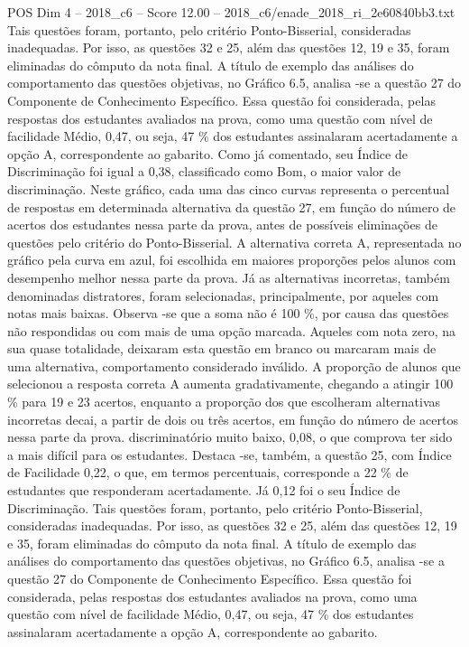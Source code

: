 \begin{textsample}{POS Dim 4 – 2018\_c6 – Score 12.00 – 2018\_c6/enade\_2018\_ri\_2e60840bb3.txt}
Tais questões foram, portanto, pelo critério Ponto-Bisserial, consideradas inadequadas.
Por isso, as questões 32 e 25, além das questões 12, 19 e 35, foram eliminadas do cômputo da nota final.
A título de exemplo das análises do comportamento das questões objetivas, no Gráfico 6.5, analisa -se a questão 27 do Componente de Conhecimento Específico.
Essa questão foi considerada, pelas respostas dos estudantes avaliados na prova, como uma questão com nível de facilidade Médio, 0,47, ou seja, 47 \% dos estudantes assinalaram acertadamente a opção A, correspondente ao gabarito.
Como já comentado, seu Índice de Discriminação foi igual a 0,38, classificado como Bom, o maior valor de discriminação.
Neste gráfico, cada uma das cinco curvas representa o percentual de respostas em determinada alternativa da questão 27, em função do número de acertos dos estudantes nessa parte da prova, antes de possíveis eliminações de questões pelo critério do Ponto-Bisserial.
A alternativa correta A, representada no gráfico pela curva em azul, foi escolhida em maiores proporções pelos alunos com desempenho melhor nessa parte da prova.
Já as alternativas incorretas, também denominadas distratores, foram selecionadas, principalmente, por aqueles com notas mais baixas.
Observa -se que a soma não é 100 \%, por causa das questões não respondidas ou com mais de uma opção marcada.
Aqueles com nota zero, na sua quase totalidade, deixaram esta questão em branco ou marcaram mais de uma alternativa, comportamento considerado inválido.
A proporção de alunos que selecionou a resposta correta A aumenta gradativamente, chegando a atingir 100 \% para 19 e 23 acertos, enquanto a proporção dos que escolheram alternativas incorretas decai, a partir de dois ou três acertos, em função do número de acertos nessa parte da prova. discriminatório muito baixo, 0,08, o que comprova ter sido a mais difícil para os estudantes.
Destaca -se, também, a questão 25, com Índice de Facilidade 0,22, o que, em termos percentuais, corresponde a 22 \% de estudantes que responderam acertadamente.
Já 0,12 foi o seu Índice de Discriminação.
Tais questões foram, portanto, pelo critério Ponto-Bisserial, consideradas inadequadas.
Por isso, as questões 32 e 25, além das questões 12, 19 e 35, foram eliminadas do cômputo da nota final.
A título de exemplo das análises do comportamento das questões objetivas, no Gráfico 6.5, analisa -se a questão 27 do Componente de Conhecimento Específico.
Essa questão foi considerada, pelas respostas dos estudantes avaliados na prova, como uma questão com nível de facilidade Médio, 0,47, ou seja, 47 \% dos estudantes assinalaram acertadamente a opção A, correspondente ao gabarito.

\end{textsample}
